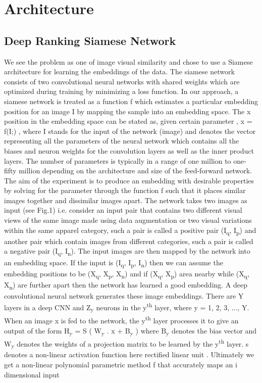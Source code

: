 \documentclass[10pt,twocolumn,letterpaper]{article}
\begin{document}
\vspace{-2mm}
\section{Architecture}\vspace{-1mm}

\subsection{Deep Ranking Siamese Network}
We see the problem as one of image visual similarity and chose to use a Siamese architecture for learning the embeddings of the data. The siamese network consists of two convolutional neural networks with shared weights which are optimized during training by minimizing a loss function. In our approach, a siamese network is treated as a function f which estimates a particular embedding position for an image I by mapping the sample into an embedding space. The x position in the embedding space can be stated as, given certain parameter ,  x = f(I;) , where I stands for the input of the network (image) and  denotes the vector representing all the parameters of the neural network which contains all the biases and neuron weights for the convolution layers as well as the inner product layers. The number of parameters is typically in a range of one million to one-fifty million depending on the architecture and size of the feed-forward network. The aim of the experiment is to produce an embedding with desirable properties by solving for the  parameter through the function f such that it places similar images together and dissimilar images apart. The network takes two images as input (see Fig.1) i.e. consider an input pair that contains two different visual views of the same image made using data augmentation or two visual variations within the same apparel category, such a pair is called a positive pair (I\textsubscript{q}, I\textsubscript{p}) and another pair which contain images from different categories, such a pair is called a negative pair (I\textsubscript{q}, I\textsubscript{n}). The input images are then mapped by the network into an embedding space. If the input is (I\textsubscript{q}, I\textsubscript{p}, I\textsubscript{n}) then we can assume the embedding positions to be (X\textsubscript{q}, X\textsubscript{p}, X\textsubscript{n}) and if (X\textsubscript{q}, X\textsubscript{p}) area nearby while (X\textsubscript{q}, X\textsubscript{n}) are further apart then the network has learned a good embedding. A deep convolutional neural network generates these image embeddings. There are Y layers in a deep CNN and Z\textsubscript{y} neurons in the y\textsuperscript{th} layer, where y = 1, 2, 3, ..., Y. When an image x is fed to the network, the y\textsuperscript{th} layer processes it to give an output of the form H\textsubscript{y} = S ( W\textsubscript{y} . x +  B\textsubscript{y} ) where B\textsubscript{y} denotes the bias vector and W\textsubscript{y} denotes the weights of a projection matrix to be learned by the y\textsuperscript{th} layer. s denotes a non-linear activation function here rectified linear unit \cite{c22}. Ultimately we get a non-linear polynomial parametric method f that accurately maps an i dimensional input 
\end{document}
